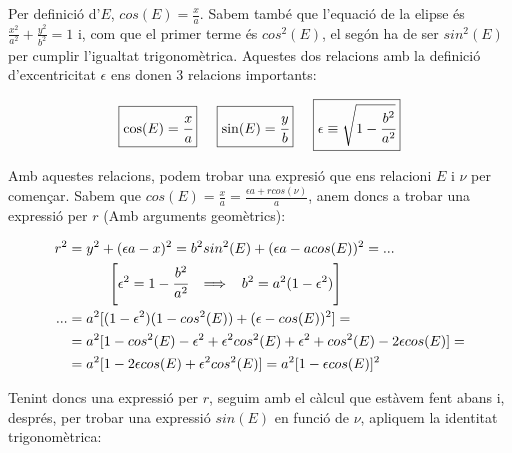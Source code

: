 \documentclass[a4paper, 11pt]{article}
\begin{document}
\noindent Per definició d'$E$, $cos(E) = \frac{x}{a}$. Sabem també que l'equació de la elipse és $\frac{x^2}{a^2} + \frac{y^2}{b^2} = 1$ i, com que el primer terme és $cos^2(E)$, el segón ha de ser $sin^2(E)$ per cumplir l'igualtat trigonomètrica. Aquestes dos relacions amb la definició d'excentricitat $\epsilon$ ens donen 3 relacions importants:

\begin{equation} \label{relacions_Eie}
    \boxed{\cos(E) = \cfrac{x}{a}} \hspace{5mm} \boxed{\sin(E) = \cfrac{y}{b}} \hspace{5mm} \boxed{\epsilon \equiv \sqrt{1-\cfrac{b^2}{a^2}}}
\end{equation}
\vspace{2mm}

\noindent Amb aquestes relacions, podem trobar una expresió que ens relacioni $E$ i $\nu$ per començar. Sabem que $cos(E) = \frac{x}{a} = \frac{\epsilon a + rcos(\nu)}{a}$, anem doncs a trobar una expressió per $r$ (Amb arguments geomètrics):

\begin{align*}
    r^2 &= y^2 + (\epsilon a - x)^2 = b^2 sin ^2(E) + (\epsilon a - acos(E))^2 = ...\\
    & \hspace{10mm} \left[ \epsilon ^2 = 1- \cfrac{b^2}{a^2} \hspace{2mm} \implies \hspace{2mm} b^2 = a^2 (1-\epsilon^2) \right] \\
    ... &= a^2 [(1-\epsilon^2)(1-cos^2(E)) + (\epsilon - cos(E))^2] = \\
    &= a^2 [1 - cos^2(E) -\epsilon ^2 + \epsilon ^2 cos^2(E) + \epsilon^2 + cos^2(E) -2\epsilon cos(E)] = \\
    &= a^2 [1 - 2\epsilon cos(E) + \epsilon^2 cos^2(E)] = a^2[1-\epsilon cos(E)]^2
\end{align*}

\noindent Tenint doncs una expressió per $r$, seguim amb el càlcul que estàvem fent abans i, després, per trobar una expressió $sin(E)$ en funció de $\nu$, apliquem la identitat trigonomètrica:
\end{document}
